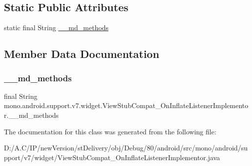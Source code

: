 \subsection*{Static Public Attributes}
\begin{DoxyCompactItemize}
\item 
static final String \hyperlink{classmono_1_1android_1_1support_1_1v7_1_1widget_1_1_view_stub_compat___on_inflate_listener_implementor_a75afa2a9c0ea491c4b7e56d95f3cbfcb}{\+\_\+\+\_\+md\+\_\+methods}
\end{DoxyCompactItemize}


\subsection{Member Data Documentation}
\mbox{\label{classmono_1_1android_1_1support_1_1v7_1_1widget_1_1_view_stub_compat___on_inflate_listener_implementor_a75afa2a9c0ea491c4b7e56d95f3cbfcb}} 
\subsubsection{\texorpdfstring{\+\_\+\+\_\+md\+\_\+methods}{\_\_md\_methods}}
{\footnotesize\ttfamily final String mono.\+android.\+support.\+v7.\+widget.\+View\+Stub\+Compat\+\_\+\+On\+Inflate\+Listener\+Implementor.\+\_\+\+\_\+md\+\_\+methods\hspace{0.3cm}{\ttfamily [static]}}



The documentation for this class was generated from the following file\+:\begin{DoxyCompactItemize}
\item 
D\+:/\+A.\+C/\+I\+P/new\+Version/st\+Delivery/obj/\+Debug/80/android/src/mono/android/support/v7/widget/View\+Stub\+Compat\+\_\+\+On\+Inflate\+Listener\+Implementor.\+java\end{DoxyCompactItemize}
